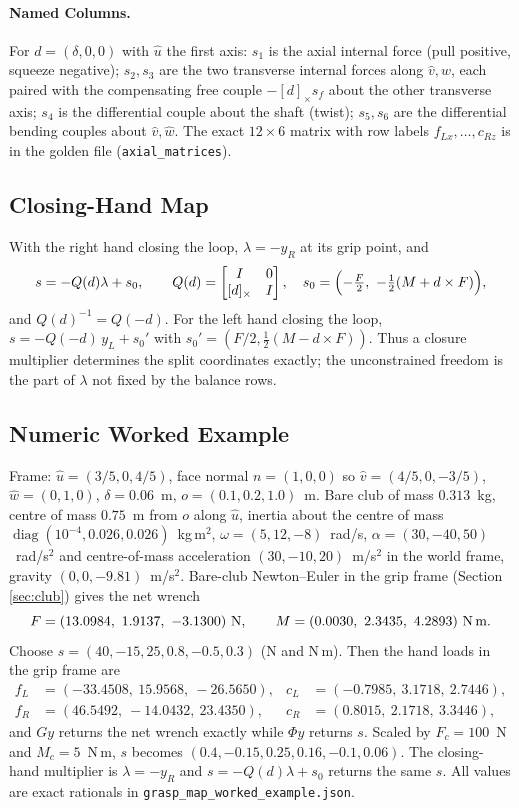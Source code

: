 \documentclass[11pt,a4paper]{article}
\newcommand{\skewm}[1]{[#1]_{\times}}
\begin{document}
\paragraph{Named Columns.}
For $d=(\delta,0,0)$ with $\hat u$ the first axis:
$s_1$ is the axial internal force (pull positive, squeeze negative);
$s_2,s_3$ are the two transverse internal forces along $\hat v,\hat w$, each
paired with the compensating free couple $-\skewm{d}s_f$ about the other
transverse axis; $s_4$ is the differential couple about the shaft (twist);
$s_5,s_6$ are the differential bending couples about $\hat v,\hat w$.  The
exact $12\times6$ matrix with row labels
$f_{Lx},\dots,c_{Rz}$ is in the golden file (\texttt{axial\_matrices}).

\subsection{Closing-Hand Map}
With the right hand closing the loop, $\lambda=-y_R$ at its grip point, and
\begin{equation}
s=-Q(d)\lambda+s_0,\qquad Q(d)=\begin{bmatrix}I&0\\ \skewm{d}&I\end{bmatrix},
\quad s_0=\Bigl(-\tfrac{F}{2},\ -\tfrac12(M+d\times F)\Bigr),
\end{equation}
and $Q(d)^{-1}=Q(-d)$.  For the left hand closing the loop, $s=-Q(-d)\,y_L+s_0'$ with
$s_0'=(F/2,\tfrac12(M-d\times F))$.  Thus a closure multiplier determines the
split coordinates exactly; the unconstrained freedom is the part of $\lambda$
not fixed by the balance rows.

\subsection{Numeric Worked Example}
Frame: $\hat u=(3/5,0,4/5)$, face normal $n=(1,0,0)$ so $\hat v=(4/5,0,-3/5)$,
$\hat w=(0,1,0)$, $\delta=0.06$~m, $o=(0.1,0.2,1.0)$~m.  Bare club of mass
$0.313$~kg, centre of mass $0.75$~m from $o$ along $\hat u$, inertia about the
centre of mass $\operatorname{diag}(10^{-4},0.026,0.026)$~kg\,m$^2$,
$\omega=(5,12,-8)$~rad/s, $\alpha=(30,-40,50)$~rad/s$^2$ and centre-of-mass
acceleration $(30,-10,20)$~m/s$^2$ in the world frame, gravity
$(0,0,-9.81)$~m/s$^2$.  Bare-club Newton--Euler in the grip frame (Section
\ref{sec:club}) gives the net wrench
\[
F=(13.0984,\ 1.9137,\ -3.1300)\ \text{N},\qquad
M=(0.0030,\ 2.3435,\ 4.2893)\ \text{N\,m}.
\]
Choose $s=(40,-15,25,0.8,-0.5,0.3)$ (N and N\,m).  Then the hand loads in the
grip frame are
\begin{align*}
f_L&=(-33.4508,\ 15.9568,\ -26.5650),&
c_L&=(-0.7985,\ 3.1718,\ 2.7446),\\
f_R&=(46.5492,\ -14.0432,\ 23.4350),&
c_R&=(0.8015,\ 2.1718,\ 3.3446),
\end{align*}
and $Gy$ returns the net wrench exactly while $\Phi y$ returns $s$.  Scaled by
$F_c=100$~N and $M_c=5$~N\,m, $s$ becomes
$(0.4,-0.15,0.25,0.16,-0.1,0.06)$.  The closing-hand multiplier is
$\lambda=-y_R$ and $s=-Q(d)\lambda+s_0$ returns the same $s$.  All values are
exact rationals in \texttt{grasp\_map\_worked\_example.json}.
\end{document}
